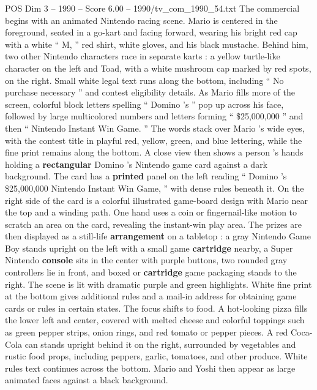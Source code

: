 \begin{textsample}{POS Dim 3 – 1990 – Score 6.00 – 1990/tv\_com\_1990\_54.txt}  \label{ex:f3_pos_054}
The commercial begins with an animated Nintendo racing scene.
Mario is centered in the foreground, seated in a go-kart and facing forward, wearing his bright red cap with a white “ M, ” red shirt, white gloves, and his black mustache.
Behind him, two other Nintendo characters race in separate karts : a yellow turtle-like character on the left and Toad, with a white mushroom cap marked by red spots, on the right.
Small white legal text runs along the bottom, including “ No purchase necessary ” and contest eligibility details.
As Mario fills more of the screen, colorful block letters spelling “ Domino ’s ” pop up across his face, followed by large multicolored numbers and letters forming “ \$25,000,000 ” and then “ Nintendo Instant Win Game. ” The words stack over Mario ’s wide eyes, with the contest title in playful red, yellow, green, and blue lettering, while the fine print remains along the bottom.
A close view then shows a person ’s hands holding a \textbf{rectangular} Domino ’s Nintendo game card against a dark background.
The card has a \textbf{printed} panel on the left reading “ Domino ’s \$25,000,000 Nintendo Instant Win Game, ” with dense rules beneath it.
On the right side of the card is a colorful illustrated game-board design with Mario near the top and a winding path.
One hand uses a coin or fingernail-like motion to scratch an area on the card, revealing the instant-win play area.
The prizes are then displayed as a still-life \textbf{arrangement} on a tabletop : a gray Nintendo Game Boy stands upright on the left with a small game \textbf{cartridge} nearby, a Super Nintendo \textbf{console} sits in the center with purple buttons, two rounded gray controllers lie in front, and boxed or \textbf{cartridge} game packaging stands to the right.
The scene is lit with dramatic purple and green highlights.
White fine print at the bottom gives additional rules and a mail-in address for obtaining game cards or rules in certain states.
The focus shifts to food.
A hot-looking pizza fills the lower left and center, covered with melted cheese and colorful toppings such as green pepper strips, onion rings, and red tomato or pepper pieces.
A red Coca-Cola can stands upright behind it on the right, surrounded by vegetables and rustic food props, including peppers, garlic, tomatoes, and other produce.
White rules text continues across the bottom.
Mario and Yoshi then appear as large animated faces against a black background.

\end{textsample}
